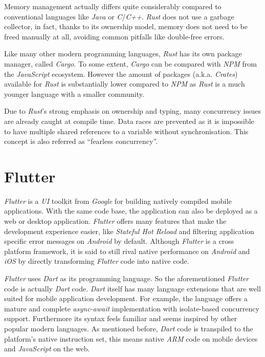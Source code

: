 Memory management actually differs quite considerably compared to conventional languages like
\textit{Java} or \textit{C}/\textit{C++}. \textit{Rust} does not use a garbage collector, in fact,
thanks to its ownership model, memory does not need to be freed manually at all, avoiding common
pitfalls like double-free errors.

Like many other modern programming languages, \textit{Rust} has its own package manager, called
\textit{Cargo}. To some extent, \textit{Cargo} can be compared with \textit{NPM} from the
\textit{JavaScript} ecosystem. However the amount of packages (a.k.a. \textit{Crates}) available for
\textit{Rust} is substantially lower compared to \textit{NPM} as \textit{Rust} is a much younger
language with a smaller community.

Due to \textit{Rust}'s strong emphasis on ownership and typing, many concurrency issues are already
caught at compile time. Data races are prevented as it is impossible to have multiple shared
references to a variable without synchronisation. This concept is also referred as “fearless
concurrency”. \cite{rustbook2}

\section{Flutter}

\textit{Flutter} is a \textit{UI} toolkit from \textit{Google} for building natively compiled mobile
applications. With the same code base, the application can also be deployed as a web or desktop application.
\textit{Flutter} offers many features that make the development experience easier, like
\textit{Stateful Hot Reload} and filtering application specific error messages on \textit{Android}
by default. Although \textit{Flutter} is a cross platform framework, it is said to still rival
native performance on \textit{Android} and \textit{iOS} by directly transforming \textit{Flutter}
code into native code.
\cite{flutter}

\textit{Flutter} uses \textit{Dart} as its programming language. So the aforementioned \textit{Flutter}
code is actually \textit{Dart} code. \textit{Dart} itself has many language extensions that are well
suited for mobile application development. For example, the language offers a mature and complete
\textit{async-await} implementation with isolate-based concurrency support. Furthermore its syntax
feels familiar and seems inspired by other popular modern languages. As mentioned before, \textit{Dart}
code is transpiled to the platform's native instruction set, this means native \textit{ARM} code on
mobile devices and \textit{JavaScript} on the web. \cite{dart}

